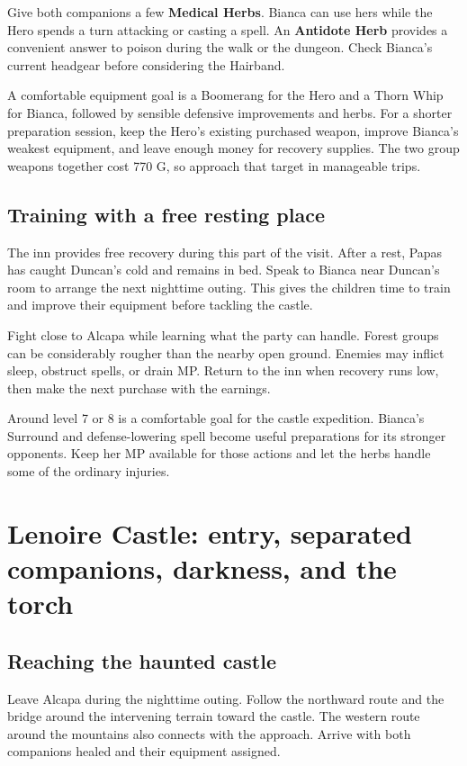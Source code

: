 Give both companions a few \textbf{Medical Herbs}. Bianca can use hers
while the Hero spends a turn attacking or casting a spell. An
\textbf{Antidote Herb} provides a convenient answer to poison during
the walk or the dungeon. Check Bianca's current headgear before considering
the Hairband.

A comfortable equipment goal is a Boomerang for the Hero and a Thorn
Whip for Bianca, followed by sensible defensive improvements and herbs.
For a shorter preparation session, keep the Hero's existing purchased
weapon, improve Bianca's weakest equipment, and leave enough money for
recovery supplies. The two group weapons together cost 770 G, so approach
that target in manageable trips.

\subsection*{Training with a free resting place}

The inn provides free recovery during this part of the visit. After a
rest, Papas has caught Duncan's cold and remains in bed. Speak to Bianca
near Duncan's room to arrange the next nighttime outing. This gives the
children time to train and improve their equipment before tackling the
castle.

Fight close to Alcapa while learning what the party can handle. Forest
groups can be considerably rougher than the nearby open ground. Enemies
may inflict sleep, obstruct spells, or drain MP. Return to the inn when
recovery runs low, then make the next purchase with the earnings.

Around level 7 or 8 is a comfortable goal for the castle expedition.
Bianca's Surround and defense-lowering spell become useful preparations
for its stronger opponents. Keep her MP available for those actions and
let the herbs handle some of the ordinary injuries.

\section{Lenoire Castle: entry, separated companions, darkness, and the torch}

\subsection*{Reaching the haunted castle}

Leave Alcapa during the nighttime outing. Follow the northward route and
the bridge around the intervening terrain toward the castle. The western
route around the mountains also connects with the approach. Arrive with
both companions healed and their equipment assigned.

